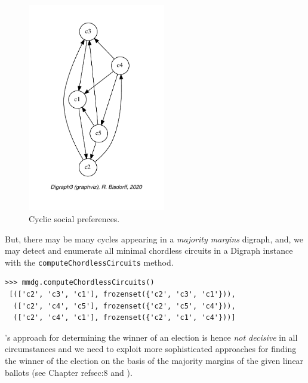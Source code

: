 \begin{figure}[h]
\sidecaption[t]
\includegraphics[width=6cm]{Figures/7-2-cycles.pdf}
\caption{Cyclic social preferences.}
\label{fig:7.2}       %
\end{figure}
	   
But, there may be many cycles appearing in a \emph{majority margins} digraph, and, we may detect and enumerate all minimal chordless circuits in a Digraph instance with the \texttt{computeChordlessCircuits} method.
\begin{lstlisting}
>>> mmdg.computeChordlessCircuits()
 [(['c2', 'c3', 'c1'], frozenset({'c2', 'c3', 'c1'})), 
  (['c2', 'c4', 'c5'], frozenset({'c2', 'c5', 'c4'})), 
  (['c2', 'c4', 'c1'], frozenset({'c2', 'c1', 'c4'}))]
\end{lstlisting}

\Condorcet 's approach for determining the winner of an election is hence \emph{not decisive} in all circumstances and we need to exploit more sophisticated approaches for finding the winner of the election on the basis of the majority margins of the given linear ballots (see Chapter ref{sec:8} and \citet{BIS-2008a}). 

